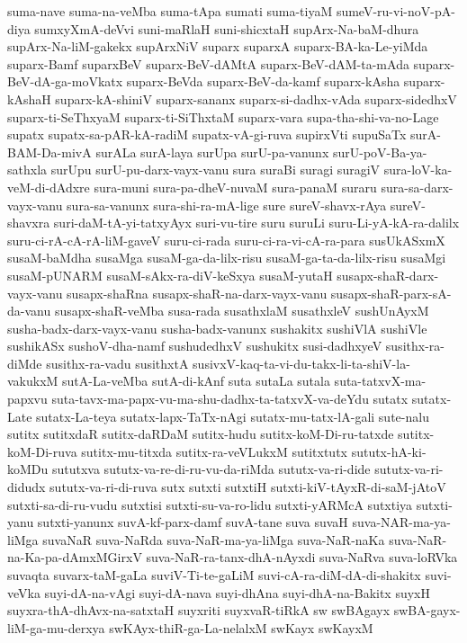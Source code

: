 {suma-nave
suma-na-veMba
suma-tApa
sumati
suma-tiyaM
sumeV-ru-vi-noV-pA-diya
sumxyXmA-deVvi
suni-maRlaH
suni-shicxtaH
supArx-Na-baM-dhura
supArx-Na-liM-gakekx
supArxNiV
suparx
suparxA
suparx-BA-ka-Le-yiMda
suparx-Bamf
suparxBeV
suparx-BeV-dAMtA
suparx-BeV-dAM-ta-mAda
suparx-BeV-dA-ga-moVkatx
suparx-BeVda
suparx-BeV-da-kamf
suparx-kAsha
suparx-kAshaH
suparx-kA-shiniV
suparx-sananx
suparx-si-dadhx-vAda
suparx-sidedhxV
suparx-ti-SeThxyaM
suparx-ti-SiThxtaM
suparx-vara
supa-tha-shi-va-no-Lage
supatx
supatx-sa-pAR-kA-radiM
supatx-vA-gi-ruva
supirxVti
supuSaTx
surA-BAM-Da-mivA
surALa
surA-laya
surUpa
surU-pa-vanunx
surU-poV-Ba-ya-sathxla
surUpu
surU-pu-darx-vayx-vanu
sura
suraBi
suragi
suragiV
sura-loV-ka-veM-di-dAdxre
sura-muni
sura-pa-dheV-nuvaM
sura-panaM
suraru
sura-sa-darx-vayx-vanu
sura-sa-vanunx
sura-shi-ra-mA-lige
sure
sureV-shavx-rAya
sureV-shavxra
suri-daM-tA-yi-tatxyAyx
suri-vu-tire
suru
suruLi
suru-Li-yA-kA-ra-dalilx
suru-ci-rA-cA-rA-liM-gaveV
suru-ci-rada
suru-ci-ra-vi-cA-ra-para
susUkASxmX
susaM-baMdha
susaMga
susaM-ga-da-lilx-risu
susaM-ga-ta-da-lilx-risu
susaMgi
susaM-pUNARM
susaM-sAkx-ra-diV-keSxya
susaM-yutaH
susapx-shaR-darx-vayx-vanu
susapx-shaRna
susapx-shaR-na-darx-vayx-vanu
susapx-shaR-parx-sA-da-vanu
susapx-shaR-veMba
susa-rada
susathxlaM
susathxleV
sushUnAyxM
susha-badx-darx-vayx-vanu
susha-badx-vanunx
sushakitx
sushiVlA
sushiVle
sushikASx
sushoV-dha-namf
sushudedhxV
sushukitx
susi-dadhxyeV
susithx-ra-diMde
susithx-ra-vadu
susithxtA
susivxV-kaq-ta-vi-du-takx-li-ta-shiV-la-vakukxM
sutA-La-veMba
sutA-di-kAnf
suta
sutaLa
sutala
suta-tatxvX-ma-papxvu
suta-tavx-ma-papx-vu-ma-shu-dadhx-ta-tatxvX-va-deYdu
sutatx
sutatx-Late
sutatx-La-teya
sutatx-lapx-TaTx-nAgi
sutatx-mu-tatx-lA-gali
sute-nalu
sutitx
sutitxdaR
sutitx-daRDaM
sutitx-hudu
sutitx-koM-Di-ru-tatxde
sutitx-koM-Di-ruva
sutitx-mu-titxda
sutitx-ra-veVLukxM
sutitxtutx
sututx-hA-ki-koMDu
sututxva
sututx-va-re-di-ru-vu-da-riMda
sututx-va-ri-dide
sututx-va-ri-didudx
sututx-va-ri-di-ruva
sutx
sutxti
sutxtiH
sutxti-kiV-tAyxR-di-saM-jAtoV
sutxti-sa-di-ru-vudu
sutxtisi
sutxti-su-va-ro-lidu
sutxti-yARMcA
sutxtiya
sutxti-yanu
sutxti-yanunx
suvA-kf-parx-damf
suvA-tane
suva
suvaH
suva-NAR-ma-ya-liMga
suvaNaR
suva-NaRda
suva-NaR-ma-ya-liMga
suva-NaR-naKa
suva-NaR-na-Ka-pa-dAmxMGirxV
suva-NaR-ra-tanx-dhA-nAyxdi
suva-NaRva
suva-loRVka
suvaqta
suvarx-taM-gaLa
suviV-Ti-te-gaLiM
suvi-cA-ra-diM-dA-di-shakitx
suvi-veVka
suyi-dA-na-vAgi
suyi-dA-nava
suyi-dhAna
suyi-dhA-na-Bakitx
suyxH
suyxra-thA-dhAvx-na-satxtaH
suyxriti
suyxvaR-tiRkA
sw
swBAgayx
swBA-gayx-liM-ga-mu-derxya
swKAyx-thiR-ga-La-nelalxM
swKayx
swKayxM
}
